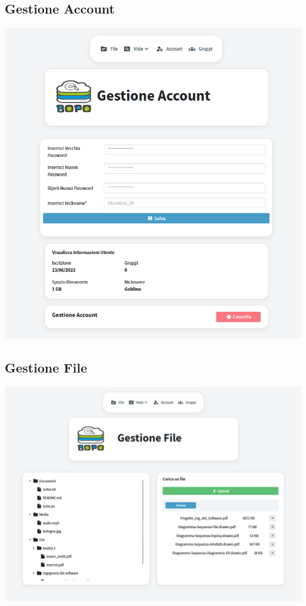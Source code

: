 \subsection*{Gestione Account}
{}
\vspace{3cm}
\begin{adjustwidth}{-1.5cm}{0cm}
\includegraphics[scale=0.8]{figs/gestione_account.png}
\end{adjustwidth}
\pagecolor{background}\afterpage{\nopagecolor}



\subsection*{Gestione File}
{}
\vspace{3cm}
\begin{adjustwidth}{-4cm}{0cm}
\includegraphics[scale=0.8]{figs/gestione_file.png}
\end{adjustwidth}
\pagecolor{background}\afterpage{\nopagecolor}


